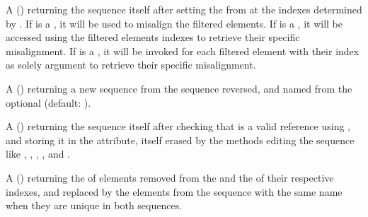 \documentclass[letterpaper,10pt,english]{sphinxmanual}
\begin{document}
\begin{description}
\sphinxAtStartPar
A  () returning the sequence itself after setting the {\hyperref[\detokenize{elements:elm-misalign}]{}} from
 at the indexes determined by . If  is a , it will be used to misalign the filtered elements.
If  is a , it will be accessed using the filtered elements indexes to retrieve their specific misalignment.
If  is a  , it will be invoked for each filtered element with their index as solely argument to retrieve their specific misalignment.

\sphinxAtStartPar
A  (\sphinxcode{\sphinxupquote{{[}name{]}}}) returning a new sequence from the sequence reversed, and named from the optional   (default: ).

\sphinxAtStartPar
A  () returning the sequence itself after checking that  is a valid reference using , and storing it in the  attribute,
itself erased by the methods editing the sequence like , , , , and .

\sphinxAtStartPar
A  () returning the  of elements removed from the  and the  of their respective indexes, and replaced by the elements from the
sequence with the same name when they are unique in both sequences.


\end{description}
\end{document}

